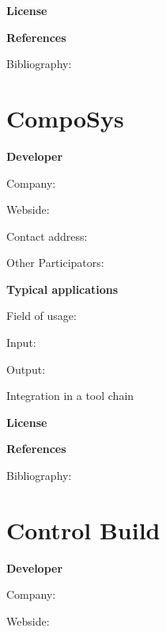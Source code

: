 \documentclass{./template/openetcs2}
\begin{document}


	\textbf{License}


	\textbf{References}

	Bibliography:


\section{CompoSys}

	\textbf{Developer}

	Company: 

	Webside:

	Contact address:

	Other  Participators:



	\textbf{Typical applications}

	Field of usage:


	Input:

	Output:





	Integration in a tool chain



	\textbf{License}


	\textbf{References}

	Bibliography:


\section{Control Build}

	\textbf{Developer}

	Company: 

	Webside:
\end{document}

